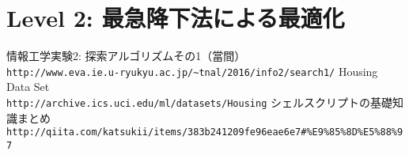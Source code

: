 \documentclass[uplatex,10pt]{jsarticle}
\begin{document}
\section{Level 2: 最急降下法による最適化}

\newpage



\vspace{+1.0cm}
\begin{thebibliography}{99}
情報工学実験2: 探索アルゴリズムその1（當間）\\
\verb|http://www.eva.ie.u-ryukyu.ac.jp/~tnal/2016/info2/search1/|
Housing Data Set\\
\verb|http://archive.ics.uci.edu/ml/datasets/Housing|
シェルスクリプトの基礎知識まとめ\\
\verb+http://qiita.com/katsukii/items/383b241209fe96eae6e7#%E9%85%8D%E5%88%97+
\end{thebibliography}
\end{document}
